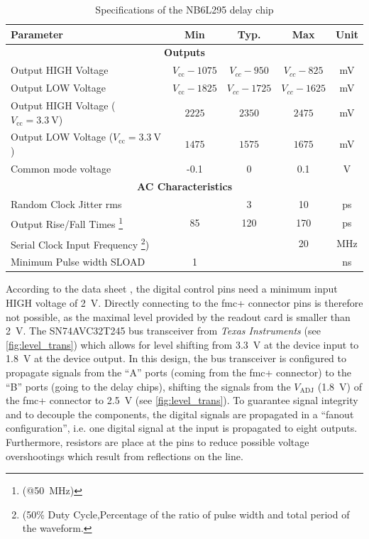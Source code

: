 \begin{table}[tb]
	\caption[NB6L295 Characteristics]{Specifications of the NB6L295 delay chip \cite{NB6L295}}
	\label{tab:nb6l295}
	\begin{minipage}{\textwidth}
		\centering
		\begin{tabularx}{\textwidth}{Xcccc}
			\toprule
			\textbf{Parameter} & \textbf{Min} & \textbf{Typ.} & \textbf{Max} & \textbf{Unit}\\
			\midrule
			\multicolumn{5}{c}{\textbf{Outputs}}  \\
			Output HIGH Voltage & $V_\text{cc} - 1075$ & $V_{cc} - 950$ & $V_{cc} - 825$ & mV\\
			Output LOW Voltage & $V_\text{cc} - 1825$ & $V_{cc} - 1725$ & $V_{cc} - 1625$ & mV\\
			Output HIGH Voltage ($V_\text{cc}=\SI{3.3}{\volt}$) & $2225$ & $2350$ & $2475$ & mV\\
			Output LOW Voltage ($V_\text{cc}=\SI{3.3}{\volt}$) & $1475$ & $1575$ & $1675$ & mV\\
			Common mode voltage & -0.1 & 0 & 0.1 & V\\[0.3cm]
			\multicolumn{5}{c}{\textbf{AC Characteristics}}  \\
			Random Clock Jitter \gls{rms}&  & 3 & 10 & ps\\
			Output Rise/Fall Times \footnote{(@\SI{50}{\mega \hertz})} & 85 & 120 & 170 & ps\\
			Serial Clock Input Frequency \footnote{(50\% Duty Cycle,Percentage of the ratio of pulse width and total period of the waveform.}) &  &  & 20 & MHz\\
			Minimum Pulse width SLOAD  & 1 &  &  & ns\\
			\bottomrule
		\end{tabularx}
	\end{minipage}
\end{table}
According to the data sheet \cite{NB6L295}, the digital control pins need a minimum input HIGH voltage of \SI{2}{\volt}.
Directly connecting to the \gls{fmc}+ connector pins is therefore not possible, as the maximal level provided by the readout card is smaller than \SI{2}{\volt}.
The SN74AVC32T245 bus transceiver from \textit{Texas Instruments} (see \autoref{fig:level_trans}) which allows for level shifting from \SI{3.3}{\volt} at the device input to \SI{1.8}{\volt} at the device output.
In this design, the bus transceiver is configured to propagate signals from the ``A'' ports (coming from the \gls{fmc}+ connector) to the ``B'' ports (going to the delay chips), shifting the signals from the $V_\text{ADJ}$ (\SI{1.8}{\volt}) of the \gls{fmc}+ connector to \SI{2.5}{\volt} (see \autoref{fig:level_trans}).
To guarantee signal integrity and to decouple the components, the digital signals are propagated in a ``fanout configuration'', i.e. one digital signal at the input is propagated to eight outputs.
Furthermore, resistors are place at the pins to reduce possible voltage overshootings which result from reflections on the line. 

